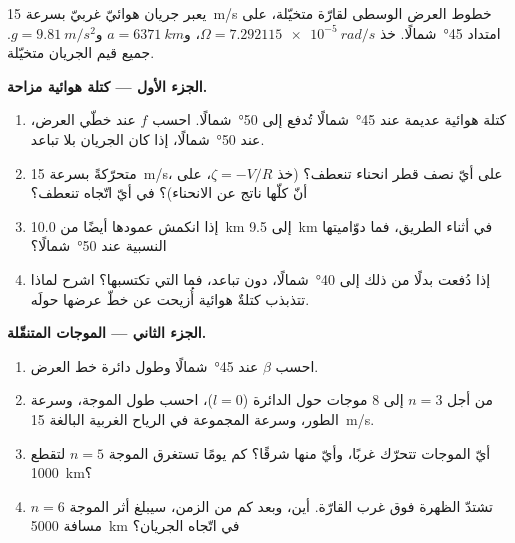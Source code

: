 \begin{problem}
\label{pb:b3:atmospheric-dynamics:1}
يعبر جريان هوائيّ غربيّ بسرعة \qty{15}{m/s} خطوط العرض الوسطى لقارّة
متخيّلة، على امتداد \ang{45}~شمالًا. خذ $\Omega =
\qty{7.292115e-5}{rad/s}$، و$a = \qty{6371}{km}$ و$g = \qty{9.81}{m/s^2}$.
جميع قيم الجريان متخيّلة.

\medskip\noindent\textbf{الجزء الأول --- كتلة هوائية مزاحة.}
\begin{enumerate}
\item كتلة هوائية عديمة  عند \ang{45}~شمالًا تُدفع إلى
  \ang{50}~شمالًا. احسب $f$ عند خطّي العرض،  عند
  \ang{50}~شمالًا، إذا كان الجريان بلا تباعد.
\item متحرّكةً بسرعة \qty{15}{m/s}، على أيّ نصف قطر انحناء تنعطف؟
  (خذ $\zeta = -V/R$، على أنّ كلّها ناتج عن الانحناء)؟ في أيّ اتّجاه تنعطف؟
\item إذا انكمش عمودها أيضًا من \qty{10.0}{km} إلى \qty{9.5}{km} في أثناء
  الطريق، فما دوّاميتها النسبية عند \ang{50}~شمالًا؟
\item إذا دُفعت بدلًا من ذلك إلى \ang{40}~شمالًا، دون تباعد، فما 
  التي تكتسبها؟ اشرح لماذا تتذبذب
  كتلةٌ هوائية أُزيحت عن خطّ عرضها حولَه.
\end{enumerate}

\medskip\noindent\textbf{الجزء الثاني --- الموجات المتنقّلة.}
\begin{enumerate}[resume]
\item احسب $\beta$ عند \ang{45}~شمالًا وطول دائرة خط العرض.
\item من أجل $n = 3$ إلى 8 موجات حول الدائرة ($l = 0$)، احسب طول الموجة،
  وسرعة الطور، وسرعة المجموعة في الرياح الغربية البالغة
  \qty{15}{m/s}.
\item أيّ الموجات تتحرّك غربًا، وأيّ منها شرقًا؟ كم يومًا تستغرق الموجة
  $n = 5$ لتقطع \qty{1000}{km}؟
\item تشتدّ الظهرة فوق غرب القارّة. أين، وبعد كم من الزمن،
  سيبلغ أثر الموجة $n = 6$ مسافة \qty{5000}{km}
  في اتّجاه الجريان؟
\end{enumerate}


\end{problem}
